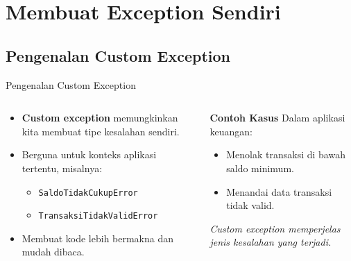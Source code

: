 \documentclass[aspectratio=169, table]{beamer}
\begin{document}
\section{Membuat Exception Sendiri}

\subsection*{Pengenalan Custom Exception}
\begin{frame}[fragile]{Pengenalan Custom Exception}
\vspace*{10pt}
\begin{columns}[T,totalwidth=\textwidth]
\begin{column}{0.58\textwidth}
\begin{itemize}
  \item \textbf{Custom exception} memungkinkan kita membuat tipe kesalahan sendiri.
  \item Berguna untuk konteks aplikasi tertentu, misalnya:
  \begin{itemize}
    \item \texttt{SaldoTidakCukupError}
    \item \texttt{TransaksiTidakValidError}
  \end{itemize}
  \item Membuat kode lebih bermakna dan mudah dibaca.
\end{itemize}
\end{column}

\begin{column}{0.37\textwidth}
\begin{block}{\textbf{Contoh Kasus}}
\small
Dalam aplikasi keuangan:
\begin{itemize}
  \item Menolak transaksi di bawah saldo minimum.
  \item Menandai data transaksi tidak valid.
\end{itemize}
\textit{Custom exception memperjelas jenis kesalahan yang terjadi.}
\end{block}
\end{column}
\end{columns}
\end{frame}

\end{document}
